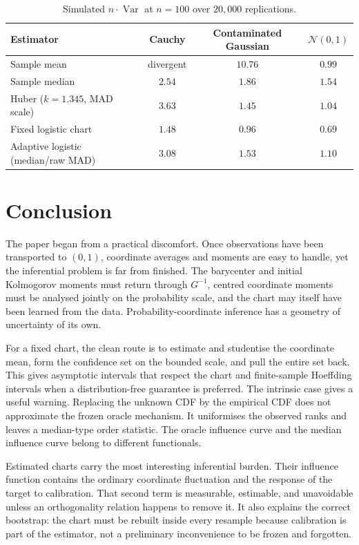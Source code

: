 \documentclass[11pt,a4paper]{article}
\theoremstyle{definition}
\newcommand{\Var}{\operatorname{Var}}
\begin{document}
\begin{table}[H]
\centering
\caption{Simulated $n\cdot\Var$ at $n=100$ over $20{,}000$ replications.}
\label{tab:sim}
\footnotesize
\setlength{\tabcolsep}{4pt}
\begin{tabular}{lccc}
\toprule
Estimator & Cauchy & Contaminated Gaussian & $\mathcal N(0,1)$\\
\midrule
Sample mean & divergent & $10.76$ & $0.99$\\
Sample median & $2.54$ & $1.86$ & $1.54$\\
Huber ($k=1.345$, MAD scale) & $3.63$ & $1.45$ & $1.04$\\
Fixed logistic chart & $1.48$ & $0.96$ & $0.69$\\
Adaptive logistic (median/raw MAD) & $3.08$ & $1.53$ & $1.10$\\
\bottomrule
\end{tabular}
\end{table}

\section{Conclusion}

The paper began from a practical discomfort. Once observations have been transported to $(0,1)$, coordinate averages and moments are easy to handle, yet the inferential problem is far from finished. The barycenter and initial Kolmogorov moments must return through $G^{-1}$, centred coordinate moments must be analysed jointly on the probability scale, and the chart may itself have been learned from the data. Probability-coordinate inference has a geometry of uncertainty of its own.

For a fixed chart, the clean route is to estimate and studentise the coordinate mean, form the confidence set on the bounded scale, and pull the entire set back. This gives asymptotic intervals that respect the chart and finite-sample Hoeffding intervals when a distribution-free guarantee is preferred. The intrinsic case gives a useful warning. Replacing the unknown CDF by the empirical CDF does not approximate the frozen oracle mechanism. It uniformises the observed ranks and leaves a median-type order statistic. The oracle influence curve and the median influence curve belong to different functionals.

Estimated charts carry the most interesting inferential burden. Their influence function contains the ordinary coordinate fluctuation and the response of the target to calibration. That second term is measurable, estimable, and unavoidable unless an orthogonality relation happens to remove it. It also explains the correct bootstrap: the chart must be rebuilt inside every resample because calibration is part of the estimator, not a preliminary inconvenience to be frozen and forgotten.
\end{document}
